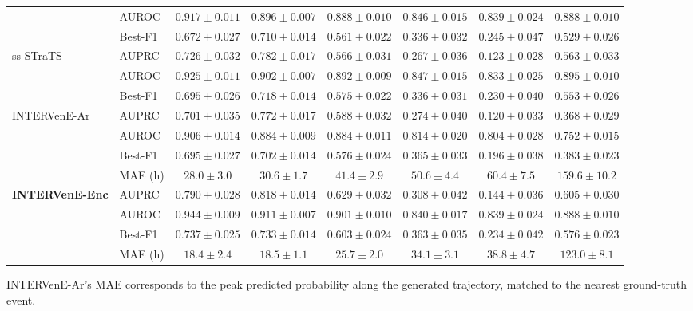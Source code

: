 \begin{table}[htbp]
{\begin{tabular}{llcccccc}
      & AUROC   & $0.917 \pm 0.011$ & $0.896 \pm 0.007$ & $0.888 \pm 0.010$ & $0.846 \pm 0.015$ & $\mathbf{0.839 \pm 0.024}$ & $0.888 \pm 0.010$ \\
      & Best-F1 & $0.672 \pm 0.027$ & $0.710 \pm 0.014$ & $0.561 \pm 0.022$ & $0.336 \pm 0.032$ & $\mathbf{0.245 \pm 0.047}$ & $0.529 \pm 0.026$ \\
    \midrule
    \multirow{3}{*}{ss-STraTS}
      & AUPRC   & $0.726 \pm 0.032$ & $0.782 \pm 0.017$ & $0.566 \pm 0.031$ & $0.267 \pm 0.036$ & $0.123 \pm 0.028$ & $0.563 \pm 0.033$ \\
      & AUROC   & $0.925 \pm 0.011$ & $0.902 \pm 0.007$ & $0.892 \pm 0.009$ & $\mathbf{0.847 \pm 0.015}$ & $0.833 \pm 0.025$ & $0.895 \pm 0.010$ \\
      & Best-F1 & $0.695 \pm 0.026$ & $0.718 \pm 0.014$ & $0.575 \pm 0.022$ & $0.336 \pm 0.031$ & $0.230 \pm 0.040$ & $0.553 \pm 0.026$ \\
    \midrule
    \multirow{4}{*}{INTERVenE-Ar}
      & AUPRC   & $0.701 \pm 0.035$ & $0.772 \pm 0.017$ & $0.588 \pm 0.032$ & $0.274 \pm 0.040$ & $0.120 \pm 0.033$ & $0.368 \pm 0.029$ \\
      & AUROC   & $0.906 \pm 0.014$ & $0.884 \pm 0.009$ & $0.884 \pm 0.011$ & $0.814 \pm 0.020$ & $0.804 \pm 0.028$ & $0.752 \pm 0.015$ \\
      & Best-F1 & $0.695 \pm 0.027$ & $0.702 \pm 0.014$ & $0.576 \pm 0.024$ & $0.365 \pm 0.033$ & $0.196 \pm 0.038$ & $0.383 \pm 0.023$ \\
      & MAE (h) & $28.0 \pm 3.0$    & $30.6 \pm 1.7$    & $41.4 \pm 2.9$    & $50.6 \pm 4.4$    & $60.4 \pm 7.5$    & $159.6 \pm 10.2$ \\
    \midrule
    \multirow{4}{*}{\textbf{INTERVenE-Enc}}
      & AUPRC   & $\mathbf{0.790 \pm 0.028}$ & $\mathbf{0.818 \pm 0.014}$ & $\mathbf{0.629 \pm 0.032}$ & $\mathbf{0.308 \pm 0.042}$ & $0.144 \pm 0.036$ & $\mathbf{0.605 \pm 0.030}$ \\
      & AUROC   & $\mathbf{0.944 \pm 0.009}$ & $\mathbf{0.911 \pm 0.007}$ & $\mathbf{0.901 \pm 0.010}$ & $0.840 \pm 0.017$ & $\mathbf{0.839 \pm 0.024}$ & $0.888 \pm 0.010$ \\
      & Best-F1 & $\mathbf{0.737 \pm 0.025}$ & $\mathbf{0.733 \pm 0.014}$ & $\mathbf{0.603 \pm 0.024}$ & $\mathbf{0.363 \pm 0.035}$ & $0.234 \pm 0.042$ & $\mathbf{0.576 \pm 0.023}$ \\
      & MAE (h) & $18.4 \pm 2.4$    & $18.5 \pm 1.1$    & $25.7 \pm 2.0$    & $34.1 \pm 3.1$    & $38.8 \pm 4.7$    & $123.0 \pm 8.1$ \\
    \bottomrule
  \end{tabular}%
  }

  \smallskip
  \footnotesize INTERVenE-Ar's MAE corresponds to the peak predicted probability along the generated trajectory, matched to the nearest ground-truth event.
\end{table}

